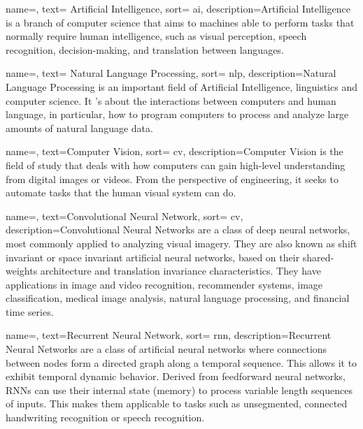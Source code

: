 \renewcommand{\acronymname}{Acronimi e abbreviazioni}

{
    name=,
    text= Artificial Intelligence,
    sort= ai,
    description={Artificial Intelligence is a branch of computer science that aims to machines able to perform tasks that normally require human intelligence, such as visual perception, speech recognition, decision-making, and translation between languages.}
}


{
    name=,
    text= Natural Language Processing,
    sort= nlp,
    description={Natural Language Processing is an important field of Artificial Intelligence, linguistics and computer science. It 's about the interactions between computers and human language, in particular, how to program computers to process and analyze large amounts of natural language data.}
}

{
    name=,
    text=Computer Vision,
    sort= cv,
    description={Computer Vision is the field of study that deals with how computers can gain high-level understanding from digital images or videos. From the perspective of engineering, it seeks to automate tasks that the human visual system can do.}
}

{
    name=,
    text=Convolutional Neural Network,
    sort= cv,
    description={Convolutional Neural Networks are a class of deep neural networks, most commonly applied to analyzing visual imagery. They are also known as shift invariant or space invariant artificial neural networks, based on their shared-weights architecture and translation invariance characteristics. They have applications in image and video recognition, recommender systems, image classification, medical image analysis, natural language processing, and financial time series.}
}

{
    name=,
    text=Recurrent Neural Network,
    sort= rnn,
    description={Recurrent Neural Networks are a class of artificial neural networks where connections between nodes form a directed graph along a temporal sequence. This allows it to exhibit temporal dynamic behavior. Derived from feedforward neural networks, RNNs can use their internal state (memory) to process variable length sequences of inputs. This makes them applicable to tasks such as unsegmented, connected handwriting recognition or speech recognition.}
}

